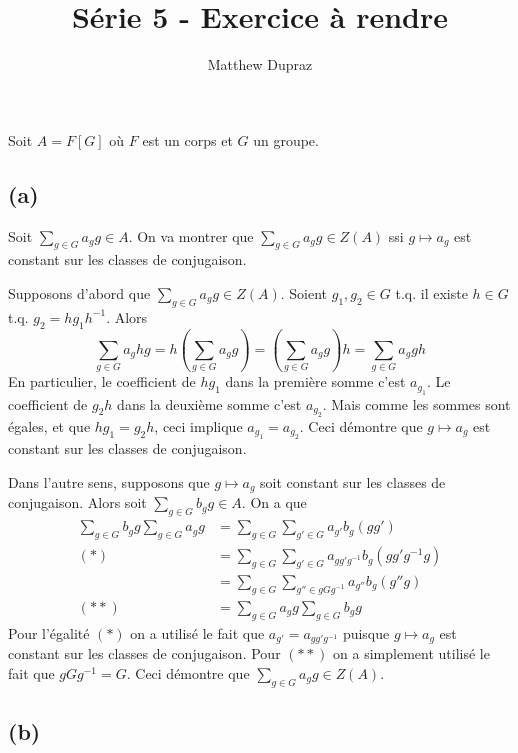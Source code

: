 \documentclass[french]{article}
\title{Série 5 - Exercice à rendre}
\author{Matthew Dupraz}
\begin{document}
\maketitle

Soit $A = F[G]$ où $F$ est un corps et $G$ un groupe.

\subsection*{(a)}

Soit $\sum_{g \in G} a_g g \in A$.
On va montrer que $\sum_{g \in G} a_g g \in Z(A)$ ssi $g \mapsto a_g$
est constant sur les classes de conjugaison.

Supposons d'abord que $\sum_{g \in G} a_g g \in Z(A)$.
Soient $g_1, g_2 \in G$ t.q. il existe $h \in G$ t.q.
$g_2 = h g_1 h^{-1}$.
Alors
\begin{equation*}
	\sum_{g \in G} a_g hg = h\left( \sum_{g\in G} a_g g \right)
	= \left(\sum_{g\in G} a_g g\right) h = \sum_{g \in G} a_g gh
\end{equation*}
En particulier, le coefficient de $hg_1$ dans la première somme c'est
$a_{g_1}$. Le coefficient de $g_2h$ dans la deuxième somme c'est
$a_{g_2}$. Mais comme les sommes sont égales, et que $hg_1 = g_2h$, ceci
implique $a_{g_1} = a_{g_2}$.
Ceci démontre que $g \mapsto a_g$ est constant sur les classes de
conjugaison.

Dans l'autre sens, supposons que $g \mapsto a_g$ soit constant sur les
classes de conjugaison. Alors soit $\sum_{g\in G} b_g g \in A$.
On a que
\begin{align*}
	\sum_{g \in G}b_{g}g \sum_{g\in G}a_{g} g &= 
	\sum_{g \in G} \sum_{g' \in G} a_{g'} b_g (gg')	\\
	(*) ~~
	&= \sum_{g \in G}\sum_{g' \in G} a_{gg'g^{-1}}b_{g} (gg'g^{-1}g)\\
	&= \sum_{g \in G}\sum_{g'' \in gGg^{-1}} a_{g''}b_g (g''g) \\
	(**) ~~ &= \sum_{g \in G}a_{g} g \sum_{g \in G} b_g g
\end{align*}
Pour l'égalité $(*)$ on a utilisé le fait que $a_{g'}= a_{gg'g^{-1}}$
puisque $g \mapsto a_g$ est constant sur les classes de conjugaison.
Pour $(**)$ on a simplement utilisé le fait que $gGg^{-1} = G$.
Ceci démontre que $\sum_{g\in G} a_g g \in Z(A)$.

\subsection*{(b)}
\end{document}
